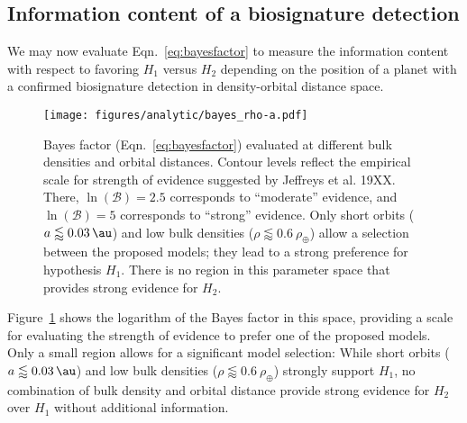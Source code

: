\documentclass[twocolumn]{aastex631}
\begin{document}
\subsection{Information content of a biosignature detection}
We may now evaluate Eqn.~\ref{eq:bayesfactor} to measure the information content with respect to favoring $H_1$ versus $H_2$ depending on the position of a planet with a confirmed biosignature detection in density-orbital distance space.
\begin{figure}[ht!]
    \begin{centering}
        \texttt{[image: figures/analytic/bayes\_rho-a.pdf]}
        \caption{
        Bayes factor (Eqn.~\ref{eq:bayesfactor}) evaluated at different bulk densities and orbital distances.
        Contour levels reflect the empirical scale for strength of evidence suggested by Jeffreys et al. 19XX.
        There, $\ln(\mathcal{B}) = 2.5$ corresponds to ``moderate'' evidence, and $\ln(\mathcal{B}) = 5 $ corresponds to ``strong'' evidence.
        Only short orbits ($a \lessapprox \SI{0.03}{\au}$) and low bulk densities ($\rho \lessapprox \SI{0.6}{\rho_\oplus}$) allow a selection between the proposed models; they lead to a strong preference for hypothesis $H_1$.
        There is no region in this parameter space that provides strong evidence for $H_2$.
        }
        \label{fig:bayes_rho-a}
    \end{centering}
\end{figure}
Figure~\ref{fig:bayes_rho-a} shows the logarithm of the Bayes factor in this space, providing a scale for evaluating the strength of evidence to prefer one of the proposed models.
Only a small region allows for a significant model selection: While short orbits ($a \lessapprox \SI{0.03}{\au}$) and low bulk densities ($\rho \lessapprox \SI{0.6}{\rho_\oplus}$) strongly support $H_1$, no combination of bulk density and orbital distance provide strong evidence for $H_2$ over $H_1$ without additional information.




\end{document}

